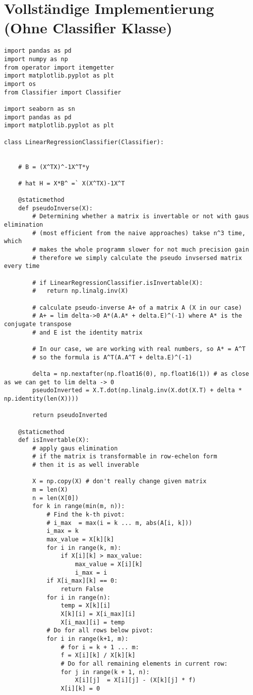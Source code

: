 \section*{Vollständige Implementierung (Ohne Classifier Klasse)}
\begin{lstlisting}[style=py]
import pandas as pd
import numpy as np
from operator import itemgetter
import matplotlib.pyplot as plt
import os
from Classifier import Classifier

import seaborn as sn
import pandas as pd
import matplotlib.pyplot as plt

class LinearRegressionClassifier(Classifier):


	# B = (X^TX)^-1X^T*y

	# hat H = X*B^ =` X(X^TX)-1X^T

	@staticmethod
	def pseudoInverse(X):
		# Determining whether a matrix is invertable or not with gaus elimination
		# (most efficient from the naive approaches) takse n^3 time, which
		# makes the whole programm slower for not much precision gain
		# therefore we simply calculate the pseudo invsersed matrix every time 

		# if LinearRegressionClassifier.isInvertable(X):
		# 	return np.linalg.inv(X)

		# calculate pseudo-inverse A+ of a matrix A (X in our case)
		# A+ = lim delta->0 A*(A.A* + delta.E)^(-1) where A* is the conjugate transpose
		# and E ist the identity matrix

		# In our case, we are working with real numbers, so A* = A^T
		# so the formula is A^T(A.A^T + delta.E)^(-1)

		delta = np.nextafter(np.float16(0), np.float16(1)) # as close as we can get to lim delta -> 0
		pseudoInverted = X.T.dot(np.linalg.inv(X.dot(X.T) + delta * np.identity(len(X))))

		return pseudoInverted

	@staticmethod
	def isInvertable(X):
		# apply gaus elimination
		# if the matrix is transformable in row-echelon form
		# then it is as well inverable

		X = np.copy(X) # don't really change given matrix
		m = len(X)
		n = len(X[0])
		for k in range(min(m, n)):
			# Find the k-th pivot:
			# i_max  = max(i = k ... m, abs(A[i, k]))
			i_max = k
			max_value = X[k][k]
			for i in range(k, m):
				if X[i][k] > max_value:
					max_value = X[i][k]
					i_max = i
			if X[i_max][k] == 0:
				return False
			for i in range(n):
				temp = X[k][i]
				X[k][i] = X[i_max][i]
				X[i_max][i] = temp
			# Do for all rows below pivot:
			for i in range(k+1, m):
				# for i = k + 1 ... m:
				f = X[i][k] / X[k][k]
				# Do for all remaining elements in current row:
				for j in range(k + 1, n):
					X[i][j]  = X[i][j] - (X[k][j] * f)
				X[i][k] = 0


\end{lstlisting}
